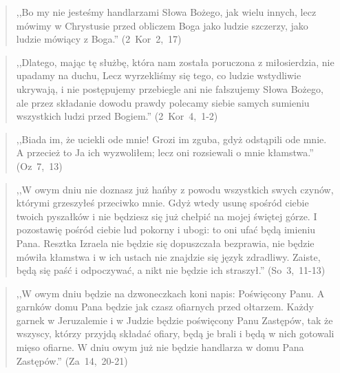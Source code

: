 \documentclass[10pt,a4paper,oneside]{article}
\begin{document}
\begin{quote}
,,Bo my nie jesteśmy handlarzami Słowa Bożego, jak wielu innych, lecz mówimy w Chrystusie przed obliczem Boga jako ludzie szczerzy, jako ludzie mówiący z Boga.'' (2~Kor~2,~17)
\end{quote}
\begin{quote}
,,Dlatego, mając tę służbę, która nam została poruczona z miłosierdzia, nie upadamy na duchu, Lecz wyrzekliśmy się tego, co ludzie wstydliwie ukrywają, i nie postępujemy przebiegle ani nie fałszujemy Słowa Bożego, ale przez składanie dowodu prawdy polecamy siebie samych sumieniu wszystkich ludzi przed Bogiem.'' (2~Kor~4,~1-2)
\end{quote}
\begin{quote}
,,Biada im, że uciekli ode mnie! Grozi im zguba, gdyż odstąpili ode mnie. A przecież to Ja ich wyzwoliłem; lecz oni rozsiewali o mnie kłamstwa.'' (Oz~7,~13)
\end{quote}
\begin{quote}
,,W owym dniu nie doznasz już hańby z powodu wszystkich swych czynów, którymi grzeszyłeś przeciwko mnie. Gdyż wtedy usunę spośród ciebie twoich pyszałków i nie będziesz się już chełpić na mojej świętej górze. I pozostawię pośród ciebie lud pokorny i ubogi: to oni ufać będą imieniu Pana. Resztka Izraela nie będzie się dopuszczała bezprawia, nie będzie mówiła kłamstwa i w ich ustach nie znajdzie się język zdradliwy. Zaiste, będą się paść i odpoczywać, a nikt nie będzie ich straszył.'' (So~3,~11-13)
\end{quote}
\begin{quote}
,,W owym dniu będzie na dzwoneczkach koni napis: Poświęcony Panu. A garnków domu Pana będzie jak czasz ofiarnych przed ołtarzem. Każdy garnek w Jeruzalemie i w Judzie będzie poświęcony Panu Zastępów, tak że wszyscy, którzy przyjdą składać ofiary, będą je brali i będą w nich gotowali mięso ofiarne. W dniu owym już nie będzie handlarza w domu Pana Zastępów.'' (Za~14,~20-21)
\end{quote}
\end{document}

